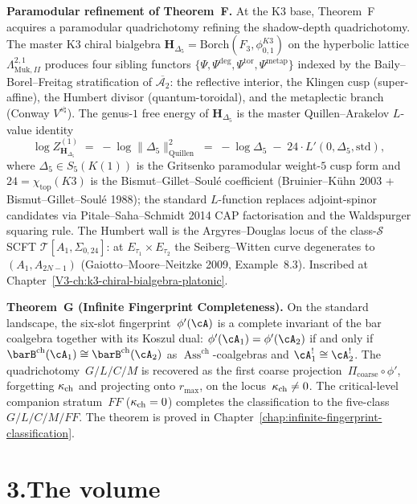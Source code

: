 \medskip

\noindent\textbf{Paramodular refinement of Theorem~F.}\enspace
At the K3 base, Theorem~F acquires a paramodular quadrichotomy
refining the shadow-depth quadrichotomy. The master K3 chiral
bialgebra
$\mathbf H_{\Delta_5}
=\mathrm{Borch}(F_3,\phi^{K3}_{0,1})$
on the hyperbolic lattice $\Lambda_{\mathrm{Muk},II}^{2,1}$
produces four sibling functors
$\{\Psi,\Psi^{\deg},\Psi^{\mathrm{tor}},\Psi^{\mathrm{metap}}\}$
indexed by the Baily--Borel--Freitag stratification of
$\overline{\mathcal A_2}$: the reflective interior, the Klingen
cusp (super-affine), the Humbert divisor (quantum-toroidal), and
the metaplectic branch (Conway $V^{s\natural}$). The
genus-$1$ free energy of $\mathbf H_{\Delta_5}$ is the master
Quillen--Arakelov $L$-value identity
\[
\log Z^{(1)}_{\mathbf H_{\Delta_5}}
\;=\;-\log\bigl\|\Delta_5\bigr\|^2_{\mathrm{Quillen}}
\;=\;-\log\Delta_5 \;-\; 24\cdot L'(0,\Delta_5,\mathrm{std}),
\]
where $\Delta_5 \in S_5(K(1))$ is the Gritsenko paramodular
weight-$5$ cusp form and $24 = \chi_{\mathrm{top}}(K3)$ is the
Bismut--Gillet--Soul\'e coefficient (Bruinier--K\"uhn 2003 +
Bismut--Gillet--Soul\'e 1988); the standard $L$-function replaces
adjoint-spinor candidates via Pitale--Saha--Schmidt 2014 CAP
factorisation and the Waldspurger squaring rule. The Humbert wall
is the Argyres--Douglas locus of the class-$\mathcal S$ SCFT
$\mathcal T[A_1,\Sigma_{0,24}]$: at $E_{\tau_1}\times E_{\tau_2}$
the Seiberg--Witten curve degenerates to $(A_1,A_{2N-1})$
(Gaiotto--Moore--Neitzke 2009, Example~8.3). Inscribed at
Chapter~\ref{V3-ch:k3-chiral-bialgebra-platonic}.

\medskip

\noindent\textbf{Theorem~G (Infinite Fingerprint Completeness).}\enspace
On the standard landscape, the six-slot fingerprint~$\phi'(\cA)$ is
a complete invariant of the bar coalgebra together with its Koszul
dual: $\phi'(\cA_1) = \phi'(\cA_2)$ if and only if
$\barB^{\mathrm{ch}}(\cA_1)\cong\barB^{\mathrm{ch}}(\cA_2)$ as
$\operatorname{Ass}^{\mathrm{ch}}$-coalgebras and
$\cA_1^{!}\cong\cA_2^{!}$. The quadrichotomy~$G/L/C/M$ is recovered
as the first coarse projection~$\Pi_{\mathrm{coarse}}\circ\phi'$,
forgetting $\kappa_{\mathrm{ch}}$ and projecting onto $r_{\max}$, on the
locus~$\kappa_{\mathrm{ch}}\ne 0$. The critical-level companion stratum~$FF$
($\kappa_{\mathrm{ch}} = 0$) completes the classification to the five-class
$G/L/C/M/FF$. The theorem is proved in
Chapter~\ref{chap:infinite-fingerprint-classification}.

\section*{3.\quad The volume}

